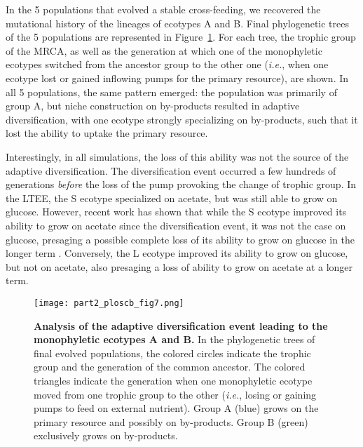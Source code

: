 In the 5 populations that evolved a stable cross-feeding, we recovered the mutational history of the lineages of ecotypes A and B. Final phylogenetic trees of the 5 populations are represented in Figure~\ref{fig:part2:first_result:Fig7}. For each tree, the trophic group of the MRCA, as well as the generation at which one of the monophyletic ecotypes switched from the ancestor group to the other one (\textit{i.e.}, when one ecotype lost or gained inflowing pumps for the primary resource), are shown.
In all 5 populations, the same pattern emerged: the population was primarily of group A, but niche construction on by-products resulted in adaptive diversification, with one ecotype strongly specializing on by-products, such that it lost the ability to uptake the primary resource.

Interestingly, in all simulations, the loss of this ability was not the source of the adaptive diversification. The diversification event occurred a few hundreds of generations \textit{before} the loss of the pump provoking the change of trophic group. In the LTEE, the S ecotype specialized on acetate, but was still able to grow on glucose. However, recent work has shown that while the S ecotype improved its ability to grow on acetate since the diversification event, it was not the case on glucose, presaging a possible complete loss of its ability to grow on glucose in the longer term \citep{grosskopf-et-al-2016}. Conversely, the L ecotype improved its ability to grow on glucose, but not on acetate, also presaging a loss of ability to grow on acetate at a longer term.

\begin{figure}[!h]
\centering
\texttt{[image: part2\_ploscb\_fig7.png]}
\caption[Analysis of the adaptive diversification event leading to the monophyletic ecotypes A and B.]{{\bf Analysis of the adaptive diversification event leading to the monophyletic ecotypes A and B.} In the phylogenetic trees of final evolved populations, the colored circles indicate the trophic group and the generation of the common ancestor. The colored triangles indicate the generation when one monophyletic ecotype moved from one trophic group to the other (\textit{i.e.}, losing or gaining pumps to feed on external nutrient). Group A (blue) grows on the primary resource and possibly on by-products. Group B (green) exclusively grows on by-products.}
\label{fig:part2:first_result:Fig7}
\end{figure}


